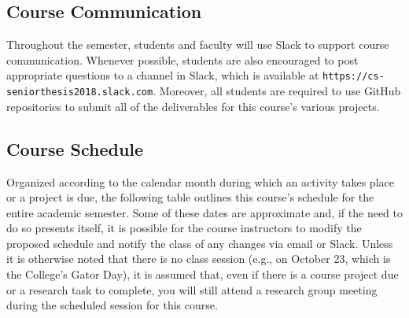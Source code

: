 \documentclass[11pt]{article}
\newcommand{\url}[1]{\lstinline{#1}}
\begin{document}
\vspace*{-.25in}
\subsection*{Course Communication}

Throughout the semester, students and faculty will use Slack to support course communication. Whenever possible, students are also encouraged to post appropriate questions to a channel in Slack, which is available at \url{https://cs-seniorthesis2018.slack.com}. Moreover, all students are required to use GitHub repositories to submit all of the deliverables for this course's various projects.

\vspace*{-.1in}
\subsection*{Course Schedule}

Organized according to the calendar month during which an activity takes place or a project is due, the following table outlines this course's schedule for the entire academic semester. Some of these dates are approximate and, if the need to do so presents itself, it is possible for the course instructors to modify
the proposed schedule and notify the class of any changes via email or Slack. Unless it is otherwise noted that there is no class session (e.g., on October 23, which is the College's Gator Day), it is assumed that, even if there is a course project due or a research task to complete, you will still attend a research group meeting during the scheduled session for this course.
\end{document}
